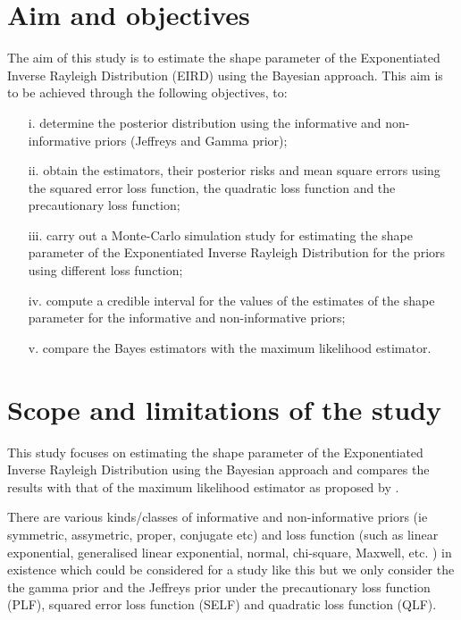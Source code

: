 \documentclass[a4paper,12pt]{report}
\newcommand{\para}{\hspace{0.5cm}}
\begin{document}
\section{Aim and objectives}
The aim of this study is to estimate the shape parameter of the Exponentiated Inverse Rayleigh Distribution (EIRD) using the Bayesian approach. This aim is to be achieved through the following objectives, to:
\begin{itemize}
	\item[i.]	determine the posterior distribution using the informative and non-informative priors (Jeffreys and Gamma prior);
	\item[ii.]	obtain the estimators, their posterior risks and mean square errors using the squared error loss function, the quadratic loss function and the precautionary loss function;
	\item[iii.]	carry out a Monte-Carlo simulation study for estimating the shape parameter of the Exponentiated Inverse Rayleigh Distribution for the priors using different loss function;
	\item [iv.]	compute a credible interval for the values of the estimates of the shape parameter for the informative and non-informative priors;
	\item[v.]	compare the Bayes estimators with the maximum likelihood estimator.

\end{itemize}

\section{Scope and limitations of the study}
\noindent\para This study focuses on estimating the shape parameter of the Exponentiated Inverse Rayleigh Distribution using the Bayesian approach and compares the results with that of the maximum likelihood estimator as proposed by \cite{rao2019exponentiated}. 

\noindent\para There are various kinds/classes of informative and non-informative priors (ie symmetric, assymetric, proper, conjugate etc) and loss function (such as linear exponential, generalised linear exponential, normal, chi-square, Maxwell, etc. ) in existence which could be considered for a study like this but we only consider the the gamma prior and the Jeffreys prior under the precautionary loss function (PLF), squared error loss function (SELF) and quadratic loss function (QLF).
\end{document}
